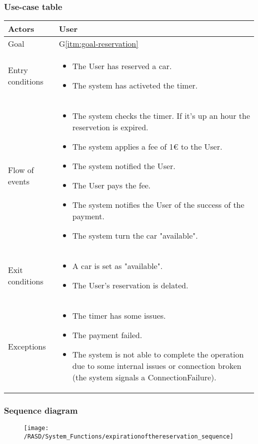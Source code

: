 \subsubsection{Use-case table}
\begin{center}
  \begin{tabular}{ l | p{10cm} }
    \hline
    Actors & User\\ \hline
    Goal & G\ref{itm:goal-reservation}\\ \hline
    Entry conditions & \begin{itemize}
			\item The User has reserved a car.
			\item The system has activeted the timer.
\end{itemize}  \\ \hline
    Flow of events &
\begin{itemize}
\item The system checks the timer. If it's up an hour the reservetion is expired.
\item The system applies a fee of 1€ to the User.
\item The system notified the User.
\item The User pays the fee.
\item The system notifies the User of the success of the payment.
\item The system turn the car "available".
\end{itemize} \\ \hline
    Exit conditions &
\begin{itemize}
	\item A car is set as "available".
	\item The User's reservation is delated.
\end{itemize}  \\ \hline
  Exceptions & 
\begin{itemize}
\item The timer has some issues.
\item The payment failed.
\item The system is not able to complete the operation due to some internal issues or connection broken (the system signals a ConnectionFailure).%
\end{itemize} 
\\ \hline
  \end{tabular}
\end{center}


\subsubsection{Sequence diagram}
\begin{figure}[!ht]
  \centering
  \vspace{0.2cm}
  \texttt{[image: /RASD/System\_Functions/expirationofthereservation\_sequence]}\\
  \vspace{0.1cm}
  \label{fig:expirationofthereservation_sequence} 
\end{figure}

